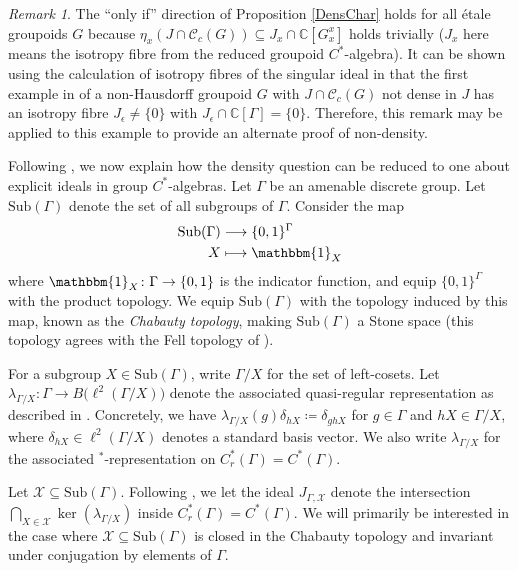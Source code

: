 \documentclass[11pt, oneside, reqno]{amsart}
\theoremstyle{definition}
\theoremstyle{remark}
\newtheorem{rmk}[thm]{Remark}
\numberwithin{equation}{section}
\begin{document}
\begin{rmk}
    The ``only if'' direction of Proposition \ref{DensChar} holds for all \'etale groupoids $G$ because $\eta_{x}(J\cap\mathscr{C}_{c}(G)) \subseteq J_{x}\cap\mathbb{C}[G^{x}_{x}]$ holds trivially ($J_{x}$ here means the isotropy fibre from the reduced groupoid $C^{*}$-algebra). It can be shown using the calculation of isotropy fibres of the singular ideal in \cite[Theorem~5.5]{Hume} that the first example in \cite{MS25} of a non-Hausdorff groupoid $G$ with $J\cap\mathscr{C}_{c}(G)$ not dense in $J$ has an isotropy fibre $J_{\epsilon}\neq \{0\}$ with $J_{\epsilon}\cap\mathbb{C}[\Gamma] = \{0\}$. Therefore, this remark may be applied to this example to provide an alternate proof of non-density.
\end{rmk}

Following \cite{Hume}, we now explain how the density question can be reduced to one about explicit ideals in group $C^{*}$-algebras. Let $\Gamma$ be an amenable discrete group. Let $\text{Sub}(\Gamma)$ denote the set of all subgroups of $\Gamma$. Consider the map
\begin{align*}
    \text{Sub}(\Gamma) &\longrightarrow \{0, 1\}^\Gamma\\
    X &\longmapsto \mathbbm{1}_X
\end{align*}
where $\mathbbm{1}_X \colon \Gamma \to \{0,1\}$ is the indicator function, and equip $\{0, 1\}^\Gamma$ with the product topology. We equip $\text{Sub}(\Gamma)$ with the topology induced by this map, known as the \emph{Chabauty topology}, making $\text{Sub}(\Gamma)$ a Stone space (this topology agrees with the Fell topology of \cite{Fell}).

\begin{sloppypar}
    For a subgroup $X \in \text{Sub}(\Gamma)$, write $\Gamma/X$ for the set of left-cosets. Let $\lambda_{\Gamma/X} \colon \Gamma \to B\big(\ell^2(\Gamma/X)\big)$ denote the associated quasi-regular representation as described in \cite{BK20}. Concretely, we have $\lambda_{\Gamma/X}(g)\delta_{hX} \coloneq \delta_{ghX}$ for $g \in \Gamma$ and $hX \in \Gamma/X$, where $\delta_{hX} \in \ell^2(\Gamma/X)$ denotes a standard basis vector. We also write $\lambda_{\Gamma/X}$ for the associated $^*$-representation on $C^*_r(\Gamma) = C^*(\Gamma)$.
\end{sloppypar}

Let $\mathcal{X} \subseteq \text{Sub}(\Gamma)$. Following \cite{Hume}, we let the ideal $J_{\Gamma,\mathcal{X}}$ denote the intersection $ \bigcap_{X\in\mathcal{X}} \ker(\lambda_{\Gamma/X})$ inside $C^{*}_{r}(\Gamma) = C^*(\Gamma)$. We will primarily be interested in the case where $\mathcal{X} \subseteq \text{Sub}(\Gamma)$ is closed in the Chabauty topology and invariant under conjugation by elements of $\Gamma$.
\end{document}
